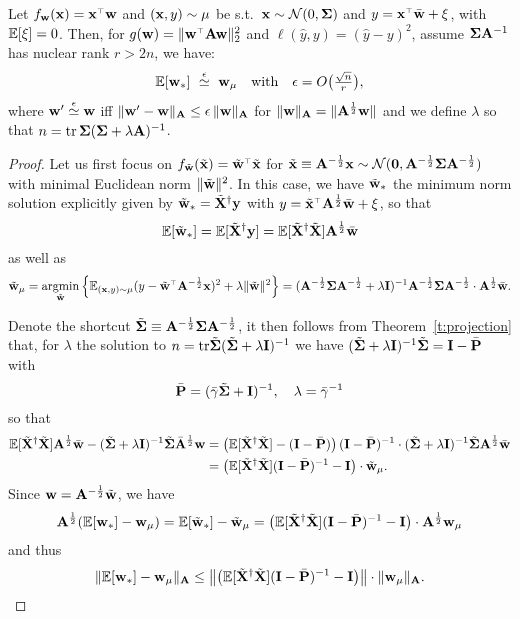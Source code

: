 \documentclass[11pt]{article}
\begin{document}
\begin{theorem}\label{t:main-Mahalanobis}
Let $f_\w(\x)=\x^\top\w$ and $(\mathbf x,y)\sim\mu$
  be s.t.~$\mathbf x\sim\mathcal{N}(0,\mathbf{\Sigma})$ and $y=\x^\top \bar \w+\xi$,
  with $\mathbb E[\xi]=0$. Then, for $g(\w)=\|\w^\top \A \w \|_2^2$
  and $\ell(\hat y, y)=(\hat y-y)^2$, assume $\mathbf{\Sigma} \mathbf A^{-1}$ has nuclear rank
  $r>2n$, we have:
  \begin{align*}
    \mathbb E [\mathbf w_*]
   \ \overset{\epsilon}{\simeq}\ \mathbf w_\mu
\quad    \text{with}\quad\epsilon = O\big(\tfrac{\sqrt n}r\big),
  \end{align*}
  where $\mathbf w'\overset\epsilon\simeq\mathbf w$ iff
  $\|\mathbf w'-\mathbf w\|_\mathbf A \leq \epsilon\,\|\mathbf w\|_\mathbf A$ for $\| \mathbf w \|_\mathbf A = \| \mathbf A^{\frac12} \mathbf w \| $ and we define $\lambda$ so that $n=\mathrm{tr}\,\mathbf{\Sigma}(\mathbf{\Sigma}+\lambda\mathbf A)^{-1}$.
\end{theorem}
\begin{proof}
Let us first focus on $f_{\tilde \w} (\tilde \x) = \tilde \w^\top \tilde \x$ for $\tilde {\mathbf x} \equiv \mathbf A^{-\frac12} \mathbf x \sim \mathcal{N} (\mathbf 0, \mathbf A^{-\frac12} \mathbf{\Sigma} \mathbf A^{-\frac12} )$ with minimal Euclidean norm $\| \tilde {\mathbf w} \|^2$. In this case, we have $\tilde {\mathbf w}_*$ the minimum norm solution explicitly given by $\tilde {\mathbf w}_* = \tilde {\mathbf X}^\dagger \mathbf y$ with $y = \tilde \x^\top \A^{\frac12} \bar \w + \xi$, so that
\[
  \mathbb E [\tilde {\mathbf w}_*]= \mathbb E[\tilde {\mathbf X}^\dagger \mathbf y] = \mathbb E[\tilde {\mathbf X}^\dagger \tilde {\mathbf X}] \mathbf A^{\frac12} \bar {\mathbf w}
\]
as well as
\[
  \tilde \w_\mu = \argmin_{\tilde \w} \left\{ \E_{(\x,y) \sim \mu} (y - \tilde \w^\top \A^{-\frac12} \x)^2 + \lambda \| \tilde \w \|^2 \right\} = (\A^{-\frac12} \Sigmab \A^{-\frac12} + \lambda \I)^{-1} \A^{-\frac12} \Sigmab \A^{-\frac12} \cdot \A^{\frac12} \bar \w.
\]

Denote the shortcut $\tilde {\mathbf{\Sigma}} \equiv \mathbf A^{-\frac12} \mathbf{\Sigma} \mathbf A^{-\frac12}$, it then follows from Theorem~\ref{t:projection} that, for $\lambda$ the solution to $n = \mathrm{tr} \tilde {\mathbf{\Sigma}} (\tilde {\mathbf{\Sigma}} + \lambda \mathbf I)^{-1}$ we have $ (\tilde {\mathbf{\Sigma}} + \lambda \mathbf I)^{-1} \tilde {\mathbf{\Sigma}} = \mathbf I - \bar {\mathbf P} $ with
\[
  \bar {\mathbf P} = (\bar \gamma \tilde {\mathbf{\Sigma}} + \mathbf I)^{-1}, \quad \lambda = \bar \gamma^{-1}
\]
so that
\begin{align*}
  \mathbb E[\tilde {\mathbf X}^\dagger \tilde {\mathbf X}] \mathbf A^{\frac12} \bar {\mathbf w} - (\tilde {\mathbf{\Sigma}} + \lambda \mathbf I)^{-1} \tilde {\mathbf{\Sigma}} \bar {\mathbf A}^{\frac12} \mathbf w &= \left( \mathbb E[\tilde {\mathbf X}^\dagger \tilde {\mathbf X}] - (\mathbf I - \bar {\mathbf P}) \right) (\mathbf I - \bar {\mathbf P})^{-1} \cdot (\tilde {\mathbf{\Sigma}} + \lambda \mathbf I)^{-1} \tilde {\mathbf{\Sigma}} \mathbf A^{\frac12} \bar {\mathbf w} \\
  &= \left( \mathbb E[\tilde {\mathbf X}^\dagger \tilde {\mathbf X}] (\mathbf I - \bar {\mathbf P})^{-1} - \mathbf I  \right) \cdot \tilde {\mathbf w}_\mu.
\end{align*}
Since $\mathbf w = \mathbf A^{-\frac12} \tilde {\mathbf w}$, we have
\begin{align*}
  \mathbf A^{\frac12} ( \mathbb E[\mathbf w_*] - \mathbf w_\mu ) = \mathbb E[\tilde {\mathbf w}_*] - \tilde {\mathbf w}_\mu = \left( \mathbb E[\tilde {\mathbf X}^\dagger \tilde {\mathbf X}] (\mathbf I - \bar {\mathbf P})^{-1} - \mathbf I  \right) \cdot \mathbf A^{\frac12} \mathbf w_\mu
\end{align*}
and thus
\[
  \| \mathbb E[\mathbf w_*] - \mathbf w_\mu \|_\mathbf A \le \left\| \left( \mathbb E[\tilde {\mathbf X}^\dagger \tilde {\mathbf X}] (\mathbf I - \bar {\mathbf P})^{-1} - \mathbf I  \right) \right\| \cdot \| \mathbf w_\mu \|_\mathbf A.
\]
\end{proof}
\end{document}
